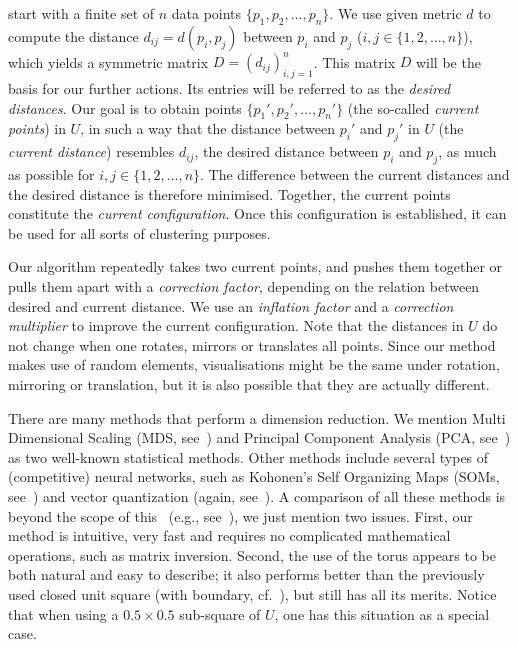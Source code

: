 \documentclass{article}
\theoremstyle{definition}
\begin{document}
 start with a finite set of $n$ data points
$\{p_1,p_2,\ldots,p_n\}$. We use  given metric $d$ to
compute the distance $d_{ij}=d(p_i,p_j)$ between $p_i$ and $p_j$
($i,j\in\{1,2,\ldots,n\}$), which yields a symmetric matrix
$D=(d_{ij})_{i,j=1}^n$. This matrix $D$ will be the basis for our further
actions. Its entries will be referred to as the \emph{desired distances}. Our
goal is to obtain points $\{p_1',p_2',\ldots,p_n'\}$ (the so-called
\emph{current points}) in $U$, in such a way that the distance between $p_i'$
and $p_j'$ in $U$ (the \emph{current distance}) resembles $d_{ij}$, the desired
distance between $p_i$ and $p_j$, as much as possible for
$i,j\in\{1,2,\ldots,n\}$. The difference between the current distances and the
desired distance is therefore minimised. Together, the current points
constitute the \emph{current configuration}. Once this configuration is
established, it can be used for all sorts of clustering purposes.

Our algorithm repeatedly takes two current points, and pushes them together or
pulls them apart with a \emph{correction factor}, depending on the relation
between desired and current distance. We use an \emph{inflation factor} and a
\emph{correction multiplier} to improve the current configuration. Note that
the distances in $U$ do not change when one rotates, mirrors or translates all
points. Since our method makes use of random elements, visualisations might be
the same under rotation, mirroring or translation, but it is also possible
that they are actually different.

There are many methods that perform a dimension reduction. We mention Multi
Dimensional Scaling (MDS, see~\cite{BG,HTF}) and Principal Component Analysis
(PCA, see~\cite{HTF}) as two well-known statistical methods. Other methods
include several types of (competitive) neural networks, such as Kohonen's Self
Organizing Maps (SOMs, see~\cite{HTF})
and vector quantization (again, see~\cite{HTF}). A comparison of all these methods is
beyond the scope of this \this\ (e.g., see~\cite{F}), we just mention two
issues. First, our method is intuitive, very fast and requires no complicated
mathematical operations, such as matrix inversion. Second, the use of the
torus appears to be both natural and easy to describe; it also performs better
than the previously used closed unit square (with boundary, cf.~\cite{KW}), but
still has all its merits. Notice that when using a $0.5\times0.5$ sub-square of
$U$, one has this situation as a special case.
\end{document}
